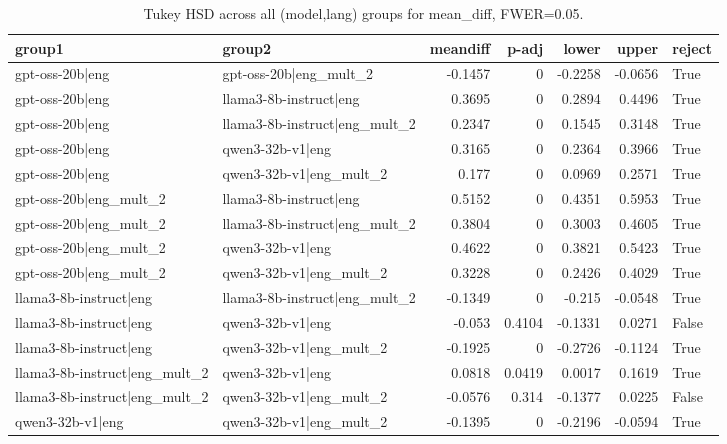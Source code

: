 \begin{table}
\caption{Tukey HSD across all (model,lang) groups for mean_diff, FWER=0.05.}
\label{tab:tukey_all_models_all_langs_mean_diff}
\begin{tabular}{l l r r r r l}
\toprule
group1 & group2 & meandiff & p-adj & lower & upper & reject \\
\midrule
gpt-oss-20b|eng & gpt-oss-20b|eng_mult_2 & -0.1457 & 0 & -0.2258 & -0.0656 & True \\
gpt-oss-20b|eng & llama3-8b-instruct|eng & 0.3695 & 0 & 0.2894 & 0.4496 & True \\
gpt-oss-20b|eng & llama3-8b-instruct|eng_mult_2 & 0.2347 & 0 & 0.1545 & 0.3148 & True \\
gpt-oss-20b|eng & qwen3-32b-v1|eng & 0.3165 & 0 & 0.2364 & 0.3966 & True \\
gpt-oss-20b|eng & qwen3-32b-v1|eng_mult_2 & 0.177 & 0 & 0.0969 & 0.2571 & True \\
gpt-oss-20b|eng_mult_2 & llama3-8b-instruct|eng & 0.5152 & 0 & 0.4351 & 0.5953 & True \\
gpt-oss-20b|eng_mult_2 & llama3-8b-instruct|eng_mult_2 & 0.3804 & 0 & 0.3003 & 0.4605 & True \\
gpt-oss-20b|eng_mult_2 & qwen3-32b-v1|eng & 0.4622 & 0 & 0.3821 & 0.5423 & True \\
gpt-oss-20b|eng_mult_2 & qwen3-32b-v1|eng_mult_2 & 0.3228 & 0 & 0.2426 & 0.4029 & True \\
llama3-8b-instruct|eng & llama3-8b-instruct|eng_mult_2 & -0.1349 & 0 & -0.215 & -0.0548 & True \\
llama3-8b-instruct|eng & qwen3-32b-v1|eng & -0.053 & 0.4104 & -0.1331 & 0.0271 & False \\
llama3-8b-instruct|eng & qwen3-32b-v1|eng_mult_2 & -0.1925 & 0 & -0.2726 & -0.1124 & True \\
llama3-8b-instruct|eng_mult_2 & qwen3-32b-v1|eng & 0.0818 & 0.0419 & 0.0017 & 0.1619 & True \\
llama3-8b-instruct|eng_mult_2 & qwen3-32b-v1|eng_mult_2 & -0.0576 & 0.314 & -0.1377 & 0.0225 & False \\
qwen3-32b-v1|eng & qwen3-32b-v1|eng_mult_2 & -0.1395 & 0 & -0.2196 & -0.0594 & True \\
\bottomrule
\end{tabular}
\end{table}
